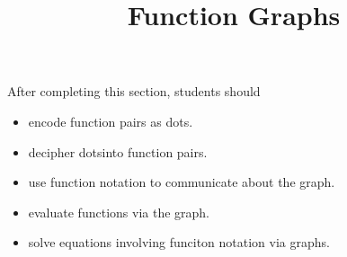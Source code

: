 \documentclass{ximera}
\title{Function Graphs}
\begin{document}
\begin{abstract}
\end{abstract}
\maketitle

\begin{sectionOutcomes}
After completing this section, students should 

\begin{itemize}
\item encode function pairs as dots.
\item decipher dotsinto function pairs.
\item use function notation to communicate about the graph.
\item evaluate functions via the graph.
\item solve equations involving funciton notation via graphs.
\end{itemize}
\end{sectionOutcomes}
\end{document}

